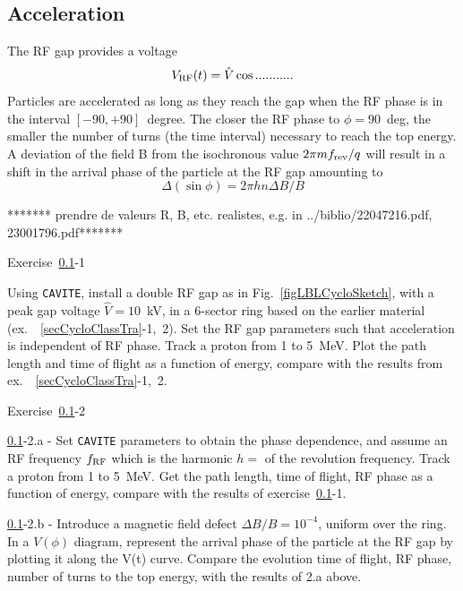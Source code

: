 \subsection{Acceleration}\label{secCycloClassAccel}


The RF gap provides a voltage  
\begin{equation}
\label{EqRCyclo}
V_{\rm RF}(t) =\hat V \cos ........... 
\end{equation}
Particles are accelerated as long as they reach the gap when the RF phase is in the 
interval $[-90,+90]$~degree. 
The closer the RF phase to $\phi=90$~deg, the smaller the number of turns 
(the time interval) necessary to reach the top energy. 
A deviation of the field B from the isochronous value $2\pi m f_{\rm rev}/q$
will result in a  shift in the arrival phase of the particle at the RF gap amounting to 
\begin{equation}
\label{EqPFPhaseCyclo}
\Delta (\sin \phi) = 2\pi h n \Delta B/B
\end{equation}

 ******* prendre de valeurs R, B, etc. realistes, e.g. in ../biblio/22047216.pdf, 23001796.pdf*******

\smallskip
\noindent {\small $\bullet$} Exercise~\ref{secCycloClassAccel}-1 

Using \texttt{CAVITE}, install a double RF gap as in Fig.~\ref{figLBLCycloSketch}, 
with a peak gap voltage $\hat V = 10$~kV, in a 6-sector ring based on the earlier material (ex.~~\ref{secCycloClassTra}-1,~2). 
Set the RF gap parameters such that acceleration is independent of RF phase.
Track a proton from 1 to 5~MeV. Plot the path length and time of flight as a function of energy, 
compare with the results from ex.~~\ref{secCycloClassTra}-1,~2.


\smallskip
\noindent {\small $\bullet$} Exercise~\ref{secCycloClassAccel}-2 

\noindent \ref{secCycloClassAccel}-2.a - 
Set \texttt{CAVITE} parameters to obtain the phase dependence, 
and assume an RF frequency $f_{\rm RF}$ which is the harmonic $h=$ of the revolution frequency.
Track a proton from 1 to 5~MeV. 
Get the path length, time of flight, RF phase as a function of energy,
compare with the results of exercise~\ref{secCycloClassAccel}-1.

\noindent \ref{secCycloClassAccel}-2.b - 
Introduce a magnetic field defect $\Delta B/B= 10^{-4}$, uniform over the ring. 
In a $V(\phi)$ diagram, represent  the arrival phase  of the particle at the RF gap
by plotting it along the V(t) curve. 
Compare the evolution time of flight, RF phase, number of turns to the top energy,
 with the results of 2.a above.




